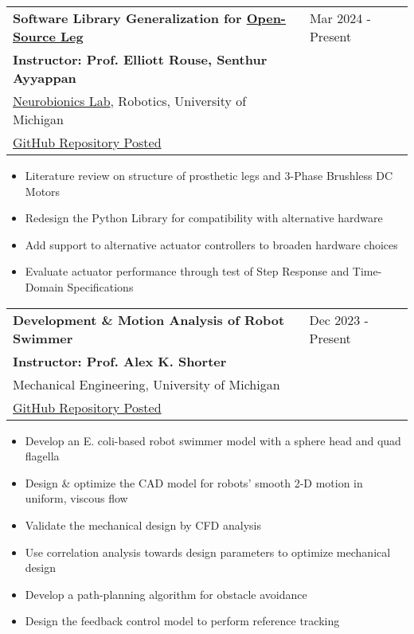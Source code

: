 \documentclass[letter,12pt]{article}
\begin{document}
\begin{tabularx}{\linewidth}{@{}l X@{}}
\large \textbf{Software Library Generalization for \href{https://www.opensourceleg.org/about}{Open-Source Leg}} & \hfill Mar 2024 - Present \\
\small{\textbf{Instructor: Prof. Elliott Rouse, Senthur Ayyappan}} & \hfill {} \\
\small{\href{https://neurobionics.robotics.umich.edu/}{Neurobionics Lab}, Robotics, University of Michigan} & \hfill {} \\
\small{\href{https://github.com/neurobionics/opensourceleg}{GitHub Repository Posted}} & \hfill {} \\
\end{tabularx}

\begin{itemize}[
    rightmargin=2cm
]
    \setlength{\itemsep}{1pt}
    \setlength{\parskip}{0pt}
    \setlength{\parsep}{0pt}
    \item{\small Literature review on structure of prosthetic legs and 3-Phase Brushless DC Motors}
    \item{\small Redesign the Python Library for compatibility with alternative hardware}
    \item{\small Add support to alternative actuator controllers to broaden hardware choices}
    \item{\small Evaluate actuator performance through test of Step Response and Time-Domain Specifications}
\end{itemize}

\begin{tabularx}{\linewidth}{@{}l X@{}}
\large \textbf{Development \& Motion Analysis of Robot Swimmer} & \hfill Dec 2023 - Present \\
\small{\textbf{Instructor: Prof. Alex K. Shorter}} & \hfill {} \\
\small{Mechanical Engineering, University of Michigan} & \hfill {} \\
\small{\href{https://github.com/Robin0265/PathPlanning_Code}{GitHub Repository Posted}} & \hfill {} \\
\end{tabularx}

\begin{itemize}[
    rightmargin=2cm
]
    \setlength{\itemsep}{1pt}
    \setlength{\parskip}{0pt}
    \setlength{\parsep}{0pt}
    \item{\small Develop an E. coli-based robot swimmer model with a sphere head and quad flagella}
    \item{\small Design \& optimize the CAD model for robots' smooth 2-D motion in uniform, viscous flow}
    \item{\small Validate the mechanical design by CFD analysis}
    \item{\small Use correlation analysis towards design parameters to optimize mechanical design}
    \item{\small Develop a path-planning algorithm for obstacle avoidance}
    \item{\small Design the feedback control model to perform reference tracking}
    
\end{itemize}
\end{document}
